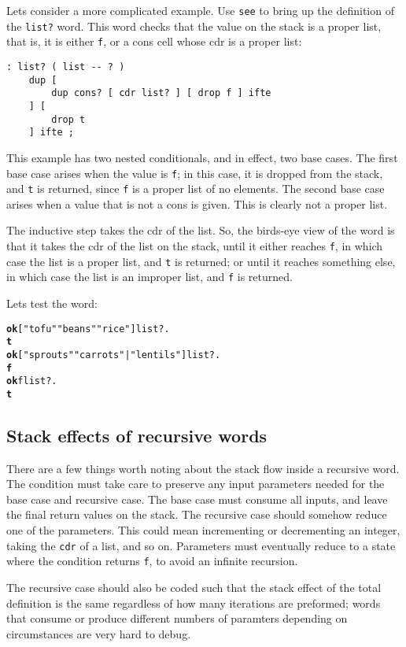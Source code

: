 \documentclass[english]{book}
\begin{document}
Lets consider a more complicated example. Use \texttt{see} to bring up the definition of the \texttt{list?} word. This word checks that the value on the stack is a proper list, that is, it is either \texttt{f}, or a cons cell whose cdr is a proper list:

\begin{verbatim}
: list? ( list -- ? )
    dup [
        dup cons? [ cdr list? ] [ drop f ] ifte
    ] [
        drop t
    ] ifte ;
\end{verbatim}

This example has two nested conditionals, and in effect, two base cases. The first base case arises when the value is \texttt{f}; in this case, it is dropped from the stack, and \texttt{t} is returned, since \texttt{f} is a proper list of no elements. The second base case arises when a value that is not a cons is given. This is clearly not a proper list.

The inductive step takes the cdr of the list. So, the birds-eye view of the word is that it takes the cdr of the list on the stack, until it either reaches \texttt{f}, in which case the list is a proper list, and \texttt{t} is returned; or until it reaches something else, in which case the list is an improper list, and \texttt{f} is returned.

Lets test the word:

\begin{alltt}
\textbf{ok} {[} "tofu" "beans" "rice" {]} list? .
\textbf{t}
\textbf{ok} {[} "sprouts" "carrots" | "lentils" {]} list? .
\textbf{f}
\textbf{ok} f list? .
\textbf{t}
\end{alltt}

\subsection{Stack effects of recursive words}

There are a few things worth noting about the stack flow inside a recursive word. The condition must take care to preserve any input parameters needed for the base case and recursive case. The base case must consume all inputs, and leave the final return values on the stack. The recursive case should somehow reduce one of the parameters. This could mean incrementing or decrementing an integer, taking the \texttt{cdr} of a list, and so on. Parameters must eventually reduce to a state where the condition returns \texttt{f}, to avoid an infinite recursion.

The recursive case should also be coded such that the stack effect of the total definition is the same regardless of how many iterations are preformed; words that consume or produce different numbers of paramters depending on circumstances are very hard to debug.
\end{document}
